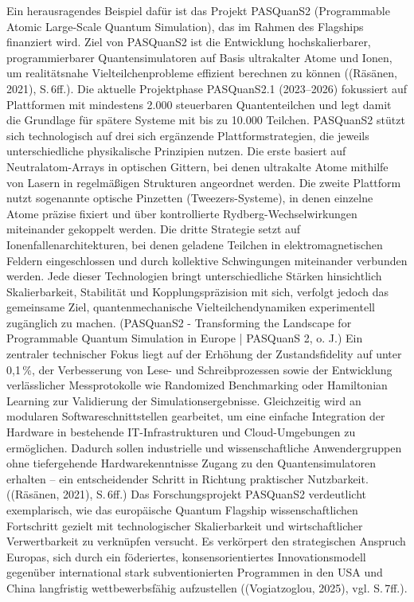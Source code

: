 Ein herausragendes Beispiel dafür ist das Projekt PASQuanS2 (Programmable Atomic Large-Scale Quantum Simulation), das im Rahmen des Flagships finanziert wird. Ziel von PASQuanS2 ist die Entwicklung hochskalierbarer, programmierbarer Quantensimulatoren auf Basis ultrakalter Atome und Ionen, um realitätsnahe Vielteilchenprobleme effizient berechnen zu können ((Räsänen, 2021), S. 6ff.). Die aktuelle Projektphase PASQuanS2.1 (2023–2026) fokussiert auf Plattformen mit mindestens 2.000 steuerbaren Quantenteilchen und legt damit die Grundlage für spätere Systeme mit bis zu 10.000 Teilchen. 
PASQuanS2 stützt sich technologisch auf drei sich ergänzende Plattformstrategien, die jeweils unterschiedliche physikalische Prinzipien nutzen. Die erste basiert auf Neutralatom-Arrays in optischen Gittern, bei denen ultrakalte Atome mithilfe von Lasern in regelmäßigen Strukturen angeordnet werden. Die zweite Plattform nutzt sogenannte optische Pinzetten (Tweezers-Systeme), in denen einzelne Atome präzise fixiert und über kontrollierte Rydberg-Wechselwirkungen miteinander gekoppelt werden. Die dritte Strategie setzt auf Ionenfallenarchitekturen, bei denen geladene Teilchen in elektromagnetischen Feldern eingeschlossen und durch kollektive Schwingungen miteinander verbunden werden. Jede dieser Technologien bringt unterschiedliche Stärken hinsichtlich Skalierbarkeit, Stabilität und Kopplungspräzision mit sich, verfolgt jedoch das gemeinsame Ziel, quantenmechanische Vielteilchendynamiken experimentell zugänglich zu machen. (PASQuanS2 - Transforming the Landscape for Programmable Quantum Simulation in Europe | PASQuanS 2, o. J.) Ein zentraler technischer Fokus liegt auf der Erhöhung der Zustandsfidelity auf unter 0,1 \%, der Verbesserung von Lese- und Schreibprozessen sowie der Entwicklung verlässlicher Messprotokolle wie Randomized Benchmarking oder Hamiltonian Learning zur Validierung der Simulationsergebnisse. Gleichzeitig wird an modularen Softwareschnittstellen gearbeitet, um eine einfache Integration der Hardware in bestehende IT-Infrastrukturen und Cloud-Umgebungen zu ermöglichen. Dadurch sollen industrielle und wissenschaftliche Anwendergruppen ohne tiefergehende Hardwarekenntnisse Zugang zu den Quantensimulatoren erhalten – ein entscheidender Schritt in Richtung praktischer Nutzbarkeit. ((Räsänen, 2021), S. 6ff.)
Das Forschungsprojekt PASQuanS2 verdeutlicht exemplarisch, wie das europäische Quantum Flagship wissenschaftlichen Fortschritt gezielt mit technologischer Skalierbarkeit und wirtschaftlicher Verwertbarkeit zu verknüpfen versucht. Es verkörpert den strategischen Anspruch Europas, sich durch ein föderiertes, konsensorientiertes Innovationsmodell gegenüber international stark subventionierten Programmen in den USA und China langfristig wettbewerbsfähig aufzustellen ((Vogiatzoglou, 2025), vgl. S. 7ff.).
 


